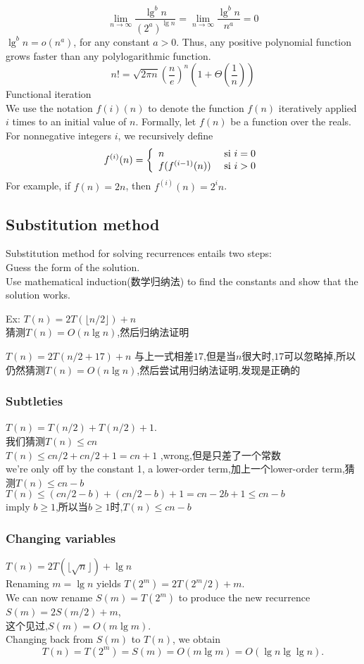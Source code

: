 \documentclass{article}
\begin{document}
$$
\lim_{n \to \infty} \frac{\lg ^b n}{(2^a)^{\lg n}} = \lim_{n \to \infty}\frac{\lg ^b n}{n^a} = 0
$$
$\lg^bn = o(n^a)$,
for any constant $a > 0$. Thus, any positive polynomial function grows faster than any polylogarithmic function.
$$
n! = \sqrt{2\pi n} (\frac{n}{e})^n (1 + \Theta(\frac{1}{n}))
$$
Functional iteration\\
We use the notation $f(i)(n)$ to denote the function $f(n)$ iteratively applied $i$ times to an initial value of $n$. Formally, let $f(n)$ be a function over the reals. For nonnegative integers $i$, we recursively define
$$
f^{(i)}(n) =
\left\{
  \begin{array}{ll}
		  n & \textrm{ si } i = 0\\
		  f(f^{(i-1)}(n)) & \textrm{ si } i >0
  \end{array}
\right.
$$
For example, if $f(n) = 2n$, then $f^{(i)}(n) = 2^in$.

\subsection{Substitution method}
Substitution method for solving recurrences entails two steps:\\
Guess the form of the solution.\\
Use mathematical induction(数学归纳法) to find the constants and show that the solution works.

Ex:
$T(n) = 2T(\lfloor n/2 \rfloor) + n$\\
猜测$T(n) = O(n \lg n)$,然后归纳法证明

$T(n) = 2T(n/2 + 17) + n$
与上一式相差$17$,但是当$n$很大时,$17$可以忽略掉,所以仍然猜测$T(n) = O(n \lg n)$,然后尝试用归纳法证明,发现是正确的

\subsubsection{Subtleties}
$T(n) = T(n/2) + T(n/2) + 1$.\\
我们猜测$T(n) \leq cn$\\
$T(n) \leq c n/2 + c n/2 + 1 =cn + 1$ ,wrong,但是只差了一个常数\\
we're only off by the constant 1, a lower-order term,加上一个lower-order term,猜测$T(n) \leq cn - b$\\
$T(n) \leq (c n/2 - b) + (c n/2- b) + 1 = cn - 2b + 1 \leq cn - b$\\
imply $b \geq 1$,所以当$b \geq 1$时,$T(n) \leq cn - b$

\subsubsection{Changing variables}
$T(n) = 2T(\lfloor \sqrt{n} \rfloor) +\lg n$\\
Renaming $m = \lg n$ yields  $T(2^m) = 2T(2^m/2) + m$.\\
We can now rename $S(m) = T(2^m)$ to produce the new recurrence
$S(m) = 2S(m/2) + m$,\\
这个见过,$S(m) = O(m \lg m)$.\\
Changing back from $S(m)$ to $T(n)$, we obtain
$$
T(n) = T(2^m) = S(m) = O(m \lg m) = O(\lg n \lg \lg n).
$$
\end{document}
